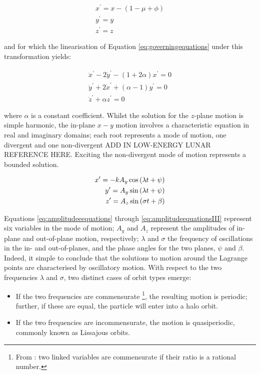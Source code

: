 \begin{align}
x^\prime = x - (1-\mu + \phi) \\
y^\prime = y\\
z^\prime = z
\end{align}

and for which the linearisation of Equation \ref{eq:governingequations} under this transformation yields:

\begin{align}
\ddot{x}^\prime - 2\dot{y}^\prime - (1+2\alpha)x^\prime = 0 \\
\ddot{y}^\prime + 2\dot{x}^\prime + (\alpha - 1)y^\prime = 0\\
\ddot{z}^\prime + \alpha z^\prime = 0
\end{align}

where $\alpha$ is a constant coefficient. Whilst the solution for the $z$-plane motion is simple harmonic, the in-plane $x-y$ motion involves a characteristic equation in real and imaginary domains; each root represents a mode of motion, one divergent and one non-divergent ADD IN LOW-ENERGY LUNAR REFERENCE HERE. Exciting the non-divergent mode of motion represents a bounded solution.

\begin{align}\label{eq:amplitudeeequations}
x^\prime = -kA_y \cos{(\lambda t + \psi)}\\
y^\prime = A_y\sin{(\lambda t + \psi)}\\
z^\prime = A_z\sin{(\sigma t + \beta)}\label{eq:amplitudeequationsIII}
\end{align}

Equations \ref{eq:amplitudeeequations} through \ref{eq:amplitudeequationsIII} represent six variables in the mode of motion; $A_y$ and $A_z$ represent the amplitudes of in-plane and out-of-plane motion, respectively; $\lambda$ and $\sigma$ the frequency of oscillations in the in- and out-of-planes, and the phase angles for the two planes, $\psi$ and $\beta$. Indeed, it simple to conclude that the solutions to motion around the Lagrange points are characterised by oscillatory motion. With respect to the two frequencies $\lambda$ and $\sigma$, two distinct cases of orbit types emerge:

\begin{itemize}
\item If the two frequencies are commensurate \footnote{From \citep{euclid}: two linked variables are commensurate if their ratio is a rational number.}, the resulting motion is periodic; further, if these are equal, the particle will enter into a halo orbit.
\item If the two frequencies are incommensurate, the motion is quasiperiodic, commonly known as Lissajous  orbits.
\end{itemize}

